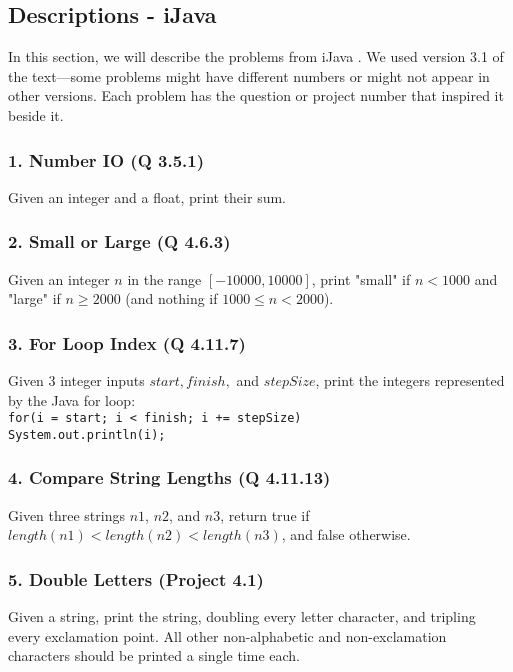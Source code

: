 \documentclass{sig-alternate}
\begin{document}
\subsection{Descriptions - iJava}

In this section, we will describe the problems from iJava \cite{iJava, Moll:2011:IOI:1968521.1968535}. We used version 3.1 of the text---some problems might have different numbers or might not appear in other versions. Each problem has the question or project number that inspired it beside it.

\subsubsection*{1. Number IO (Q 3.5.1)}
Given an integer and a float, print their sum.

\subsubsection*{2. Small or Large (Q 4.6.3)}
Given an integer $n$ in the range $[-10000, 10000]$, print "small" if $n < 1000$ and "large" if $n \ge 2000$ (and nothing if $1000 \le n < 2000$).

\subsubsection*{3. For Loop Index (Q 4.11.7)}
Given 3 integer inputs $start, finish,$ and $stepSize$, print the integers represented by the Java for loop: \\
\texttt{for(i = start; i < finish; i += stepSize) \\ \- \- \- \- System.out.println(i);}

\subsubsection*{4. Compare String Lengths (Q 4.11.13)}
Given three strings $n1$, $n2$, and $n3$, return true if $length(n1) < length(n2) < length(n3)$, and false otherwise.

\subsubsection*{5. Double Letters (Project 4.1)}
Given a string, print the string, doubling every letter character, and tripling every exclamation point. All other non-alphabetic and non-exclamation characters should be printed a single time each.
\end{document}

